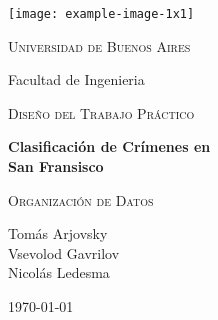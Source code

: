\begin{titlepage}
  \centering
  \texttt{[image: example-image-1x1]}\par\vspace{1cm}
  {\scshape\LARGE{Universidad de Buenos Aires}} \\
  {\Large{Facultad de Ingenieria}\par}
  \vspace{1cm}
  {\scshape\Large Diseño del Trabajo Práctico \par}
  \vspace{1.5cm}
  {\huge\bfseries Clasificación de Crímenes en\\ San Fransisco\par}
  \vspace{2cm}
  {\Large\textsc{Organización de Datos}}
  \vfill
  {Tomás Arjovsky\\ Vsevolod Gavrilov\\ Nicolás Ledesma \par}

  \vfill

  {\large \today\par}
\end{titlepage}
